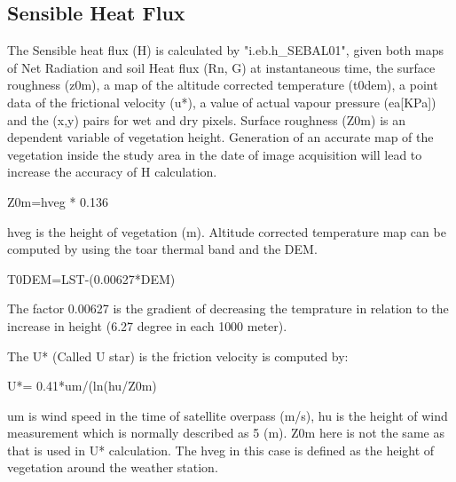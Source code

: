 \subsection{Sensible Heat Flux}
The Sensible heat flux (H) is calculated by "i.eb.h\_SEBAL01", given both maps of Net Radiation and soil Heat flux (Rn, G) at instantaneous time, the surface roughness (z0m), a map of the altitude corrected temperature (t0dem), a point data of the frictional velocity (u*), a value of actual vapour pressure (ea[KPa]) and the (x,y) pairs for wet and dry pixels.\newline
Surface roughness (Z0m) is an dependent variable of vegetation height. Generation of an accurate map of the vegetation inside the study area in the date of image acquisition will lead to increase the accuracy of H calculation.\newline
\begin{smallverbatim}
    Z0m=hveg * 0.136 
\end{smallverbatim}
hveg is the height of vegetation (m).\newline
Altitude corrected temperature map can be computed by using the toar thermal band and the DEM.\newline
\begin{smallverbatim}
    T0DEM=LST-(0.00627*DEM)
\end{smallverbatim}
The factor 0.00627 is the gradient of decreasing the temprature in relation to the increase in height (6.27 degree in each 1000 meter).\newline

The U* (Called U star) is the friction velocity is computed by:\newline
\begin{smallverbatim}
    U*= 0.41*um/(ln(hu/Z0m) 
\end{smallverbatim}
um is wind speed in the time of satellite overpass (m/s), hu is the height of wind measurement which is normally described as 5 (m). Z0m here is not the same as that is used in  U* calculation. The  hveg in this case is defined as the height of vegetation around the weather station.\newline

